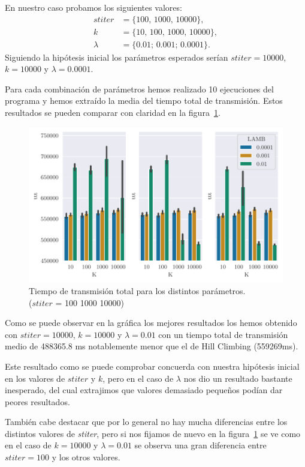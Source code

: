 En nuestro caso probamos los siguientes valores:
\begin{align*}
stiter&=\{100,\,1000,\,10000\},\\
k&=\{10,\,100,\,1000,\,10000\},\\
\lambda&=\{0.01;\,0.001;\,0.0001\}.
\end{align*}
Siguiendo la hipótesis inicial los parámetros esperados serían $stiter=10000$, $k=10000$ y $\lambda=0.0001$.

Para cada combinación de parámetros hemos realizado 10 ejecuciones del programa y hemos extraído la media del tiempo total de transmisión. Estos resultados se pueden comparar con claridad en la figura~\ref{fig:ex3_histSA}.

\begin{figure}[H]
    \centering
    \includegraphics{include/plots/ex3_histSA.pdf}
    \caption{Tiempo de transmisión total para los distintos parámetros.\\ ($stiter$ = 100 1000 10000)}
    \label{fig:ex3_histSA}
\end{figure}

Como se puede observar en la gráfica los mejores resultados los hemos obtenido con $stiter=10000$, $k=10000$ y $\lambda=0.01$ con un tiempo total de transmisión medio de 488365.8 ms notablemente menor que el de Hill Climbing (559269ms). 

Este resultado como se puede comprobar concuerda con nuestra hipótesis inicial en los valores de $stiter$ y $k$, pero en el caso de $\lambda$ nos dio un resultado bastante inesperado, del cual extrajimos que valores demasiado pequeños podían dar peores resultados.

También cabe destacar que por lo general no hay mucha diferencias entre los distintos valores de \emph{stiter}, pero si nos fijamos de nuevo en la figura~\ref{fig:ex3_histSA} se ve como en el caso de $k=10000$ y $\lambda=0.01$ se observa una gran diferencia entre $stiter=100$ y los otros valores.

